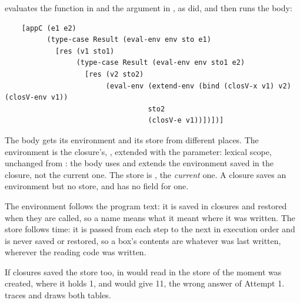  evaluates the function in  and the argument in , as  did, and then runs the body:
\begin{lstlisting}
    [appC (e1 e2)
          (type-case Result (eval-env env sto e1)
            [res (v1 sto1)
                 (type-case Result (eval-env env sto1 e2)
                   [res (v2 sto2)
                        (eval-env (extend-env (bind (closV-x v1) v2) (closV-env v1))
                                  sto2
                                  (closV-e v1))])])]
\end{lstlisting}
The body gets its environment and its store from different places. The environment is the closure's, , extended with the parameter: lexical scope, unchanged from : the body uses and extends the environment saved in the closure, not the current one. The store is , the \emph{current} one. A closure saves an environment but no store, and  has no field for one.

\begin{keypoint}
The environment follows the program text: it is saved in closures and restored when they are called, so a name means what it meant where it was written. The store follows time: it is passed from each step to the next in execution order and is never saved or restored, so a box's contents are whatever was last written, wherever the reading code was written.
\end{keypoint}
If closures saved the store too,  in  would read  in the store of the moment  was created, where it holds 1, and  would give 11, the wrong answer of Attempt 1.  traces  and draws both tables.
